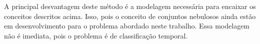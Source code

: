 A principal desvantagem deste método é a modelagem necessária para encaixar os
conceitos descritos acima. Isso, pois o conceito de conjuntos nebulosos ainda
estão em desenvolvimento para o problema abordado neste trabalho. Essa modelagem
não é imediata, pois o problema é de classificação temporal.

